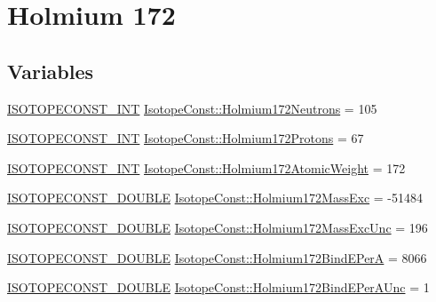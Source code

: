 \hypertarget{group___isotope_const-_holmium-_ho172}{}\section{Holmium 172}
\label{group___isotope_const-_holmium-_ho172}
\subsection*{Variables}
\begin{DoxyCompactItemize}
\item 
\mbox{\hyperlink{group___isotope_const-_macros_ga5f18360b3e99483a35c32d789e62621c}{I\+S\+O\+T\+O\+P\+E\+C\+O\+N\+S\+T\+\_\+\+I\+NT}} \mbox{\hyperlink{group___isotope_const-_holmium-_ho172_ga9eb827edcd4a7df73db5a8748290f678}{Isotope\+Const\+::\+Holmium172\+Neutrons}} = 105
\item 
\mbox{\hyperlink{group___isotope_const-_macros_ga5f18360b3e99483a35c32d789e62621c}{I\+S\+O\+T\+O\+P\+E\+C\+O\+N\+S\+T\+\_\+\+I\+NT}} \mbox{\hyperlink{group___isotope_const-_holmium-_ho172_ga587145c66196d04c8e184ef3481d746a}{Isotope\+Const\+::\+Holmium172\+Protons}} = 67
\item 
\mbox{\hyperlink{group___isotope_const-_macros_ga5f18360b3e99483a35c32d789e62621c}{I\+S\+O\+T\+O\+P\+E\+C\+O\+N\+S\+T\+\_\+\+I\+NT}} \mbox{\hyperlink{group___isotope_const-_holmium-_ho172_ga76a1a30e5f1c8b79084e1d31194c171d}{Isotope\+Const\+::\+Holmium172\+Atomic\+Weight}} = 172
\item 
\mbox{\hyperlink{group___isotope_const-_macros_ga8f45a7272ce02c0b4c65c44636ed719a}{I\+S\+O\+T\+O\+P\+E\+C\+O\+N\+S\+T\+\_\+\+D\+O\+U\+B\+LE}} \mbox{\hyperlink{group___isotope_const-_holmium-_ho172_ga7a5c200a27214ae497de5bfcd2324598}{Isotope\+Const\+::\+Holmium172\+Mass\+Exc}} = -\/51484
\item 
\mbox{\hyperlink{group___isotope_const-_macros_ga8f45a7272ce02c0b4c65c44636ed719a}{I\+S\+O\+T\+O\+P\+E\+C\+O\+N\+S\+T\+\_\+\+D\+O\+U\+B\+LE}} \mbox{\hyperlink{group___isotope_const-_holmium-_ho172_gad11cecec7400c0112d2256884280b5b4}{Isotope\+Const\+::\+Holmium172\+Mass\+Exc\+Unc}} = 196
\item 
\mbox{\hyperlink{group___isotope_const-_macros_ga8f45a7272ce02c0b4c65c44636ed719a}{I\+S\+O\+T\+O\+P\+E\+C\+O\+N\+S\+T\+\_\+\+D\+O\+U\+B\+LE}} \mbox{\hyperlink{group___isotope_const-_holmium-_ho172_ga3d52816a529a9540a588e4c178e08dd8}{Isotope\+Const\+::\+Holmium172\+Bind\+E\+PerA}} = 8066
\item 
\mbox{\hyperlink{group___isotope_const-_macros_ga8f45a7272ce02c0b4c65c44636ed719a}{I\+S\+O\+T\+O\+P\+E\+C\+O\+N\+S\+T\+\_\+\+D\+O\+U\+B\+LE}} \mbox{\hyperlink{group___isotope_const-_holmium-_ho172_gaa8a0a9064d5e255fe0a8fdbe4b6cc706}{Isotope\+Const\+::\+Holmium172\+Bind\+E\+Per\+A\+Unc}} = 1

\end{DoxyCompactItemize}
